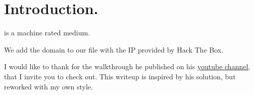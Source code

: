 \section{Introduction.}
\par {} is a machine rated medium.
\par We add the domain  to our  file with the IP provided by Hack The Box.
\par I would like to thank  for the walkthrough he published on his \href{https://www.youtube.com/c/ippsec}{youtube channel}, that I invite you to check out. This writeup is inspired by his solution, but reworked with my own style.
